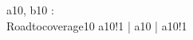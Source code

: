 \begin{circus}
\circchannel a10, b10 : \nat \\
\circprocess Roadtocoverage10 \circdef \circbegin
	\circspot
	    a10!1 \then \Skip \lpar | \lchanset a10 \rchanset | \rpar a10!1 \then \Skip
	    \\
	\circend
\end{circus}
